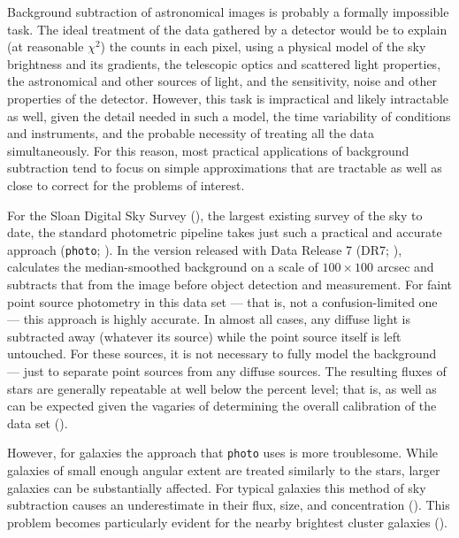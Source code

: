 \documentclass[10pt,preprint]{aastex}
\begin{document}
Background subtraction of astronomical images is probably a formally
impossible task.  The ideal treatment of the data gathered by a
detector would be to explain (at reasonable $\chi^2$) the counts in
each pixel, using a physical model of the sky brightness and its
gradients, the telescopic optics and scattered light properties, the
astronomical and other sources of light, and the sensitivity, noise
and other properties of the detector.
However, this task is impractical and likely intractable as well,
given the detail needed in such a model, the time variability of
conditions and instruments, and the probable necessity of treating all
the data simultaneously. For this reason, most practical applications
of background subtraction tend to focus on simple approximations that
are tractable as well as close to correct for the problems of
interest.

For the Sloan Digital Sky Survey (\citealt{york00a}), the largest
existing survey of the sky to date, the standard photometric pipeline
takes just such a practical and accurate approach ({\tt photo};
\citealt{lupton01a}). In the version released with Data Release 7
(DR7; \citealt{abazajian09a}), calculates the median-smoothed
background on a scale of $100\times100$ arcsec and subtracts that from
the image before object detection and measurement. For faint point
source photometry in this data set --- that is, not a
confusion-limited one --- this approach is highly accurate. In almost
all cases, any diffuse light is subtracted away (whatever its source)
while the point source itself is left untouched. For these sources, it
is not necessary to fully model the background --- just to separate
point sources from any diffuse sources. The resulting fluxes of stars
are generally repeatable at well below the percent level; that is, as
well as can be expected given the vagaries of determining the overall
calibration of the data set (\citealt{padmanabhan07a}).

However, for galaxies the approach that {\tt photo} uses is more
troublesome.  While galaxies of small enough angular extent are
treated similarly to the stars, larger galaxies can be substantially
affected. For typical galaxies this method of sky subtraction causes
an underestimate in their flux, size, and concentration
(\citealt{blanton05b}). This problem becomes particularly evident for the
nearby brightest cluster galaxies (\citealt{bernardi07a,
lauer07a}).
\end{document}
